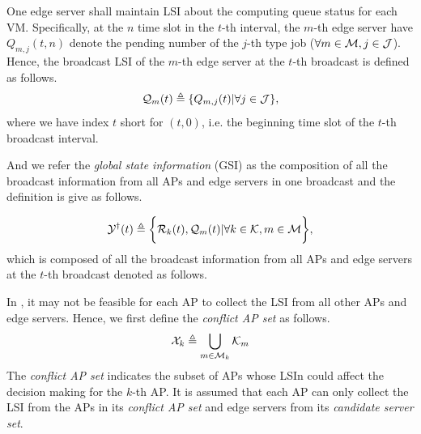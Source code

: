 \begin{definition}
    One edge server shall maintain LSI about the computing queue status for each VM.
    Specifically, at the $n$ time slot in the $t$-th interval, the $m$-th edge server have $Q_{m,j}({t,n})$ denote the pending number of the $j$-th type job ($\forall m\in\mathcal{M}, j\in\mathcal{J}$).
    Hence, the broadcast LSI of the $m$-th edge server at the $t$-th broadcast is defined as follows.
    \begin{align}
        \mathcal{Q}_{m}({t}) \triangleq \{Q_{m,j}({t}) | \forall j\in\mathcal{J}\},
    \end{align}
    where we have index $t$ short for $(t, 0)$, i.e. the beginning time slot of the $t$-th broadcast interval.
\end{definition}

And we refer the \emph{global state information} (GSI) as the composition of all the broadcast information from all APs and edge servers in one broadcast and the definition is give as follows.
\begin{definition}
    \begin{align}
        \mathcal{Y}^{\dagger}(t) \triangleq
            \bigg\{
                \mathcal{R}_{k}({t}), \mathcal{Q}_{m}({t}) | \forall k\in\mathcal{K}, m\in\mathcal{M}
            \bigg\},
    \end{align}
    which is composed of all the broadcast information from all APs and edge servers at the $t$-th broadcast denoted as follows.
\end{definition}

In , it may not be feasible for each AP to collect the LSI from all other APs and edge servers.
Hence, we first define the \emph{conflict AP set} as follows.
\begin{align}
    \mathcal{X}_{k} \triangleq \bigcup_{m\in\mathcal{M}_{k}} \mathcal{K}_{m}
\end{align}
The \emph{conflict AP set} indicates the subset of APs whose LSIn could affect the decision making for the $k$-th AP.
It is assumed that each AP can only collect the LSI from the APs in its \emph{conflict AP set} and edge servers from its \emph{candidate server set}.

